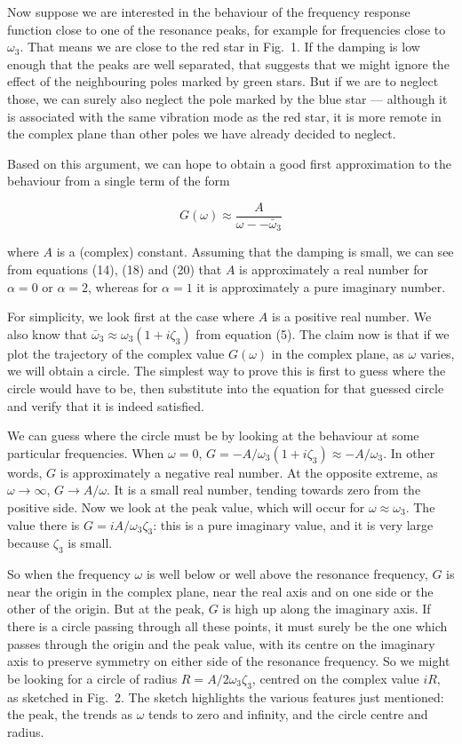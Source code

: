   Now suppose we are interested in the behaviour of the frequency response 
  function close to one of the resonance peaks, for example for frequencies 
  close to $\omega_3$. That means we are close to the red star in Fig.\ 1. If 
  the damping is low enough that the peaks are well separated, that suggests 
  that we might ignore the effect of the neighbouring poles marked by green 
  stars. But if we are to neglect those, we can surely also neglect the pole 
  marked by the blue star --- although it is associated with the same vibration 
  mode as the red star, it is more remote in the complex plane than other poles 
  we have already decided to neglect. 

  Based on this argument, we can hope to obtain a good first approximation to 
  the behaviour from a single term of the form 

  $$G(\omega) \approx \dfrac{A}{\omega -- \bar{\omega}_3} \tag{21}$$ 

  where $A$ is a (complex) constant. Assuming that the damping is small, we can 
  see from equations (14), (18) and (20) that $A$ is approximately a real 
  number for $\alpha = 0$ or $\alpha = 2$, whereas for $\alpha=1$ it is 
  approximately a pure imaginary number. 

  For simplicity, we look first at the case where $A$ is a positive real 
  number. We also know that $\bar{\omega}_3 \approx \omega_3(1+i \zeta_3)$ from 
  equation (5). The claim now is that if we plot the trajectory of the complex 
  value $G(\omega)$ in the complex plane, as $\omega$ varies, we will obtain a 
  circle. The simplest way to prove this is first to guess where the circle 
  would have to be, then substitute into the equation for that guessed circle 
  and verify that it is indeed satisfied. 

  We can guess where the circle must be by looking at the behaviour at some 
  particular frequencies. When $\omega=0$, $G=-A/\omega_3(1+i \zeta_3) \approx 
  -A/\omega_3$. In other words, $G$ is approximately a negative real number. At 
  the opposite extreme, as $\omega \rightarrow\infty$, $G \rightarrow 
  A/\omega$. It is a small real number, tending towards zero from the positive 
  side. Now we look at the peak value, which will occur for $\omega \approx 
  \omega_3$. The value there is $G=iA/\omega_3 \zeta_3$: this is a pure 
  imaginary value, and it is very large because $\zeta_3$ is small. 

  So when the frequency $\omega$ is well below or well above the resonance 
  frequency, $G$ is near the origin in the complex plane, near the real axis 
  and on one side or the other of the origin. But at the peak, $G$ is high up 
  along the imaginary axis. If there is a circle passing through all these 
  points, it must surely be the one which passes through the origin and the 
  peak value, with its centre on the imaginary axis to preserve symmetry on 
  either side of the resonance frequency. So we might be looking for a circle 
  of radius $R=A/2\omega_3 \zeta_3$, centred on the complex value $iR$, as 
  sketched in Fig.\ 2. The sketch highlights the various features just 
  mentioned: the peak, the trends as $\omega$ tends to zero and infinity, and 
  the circle centre and radius. 

